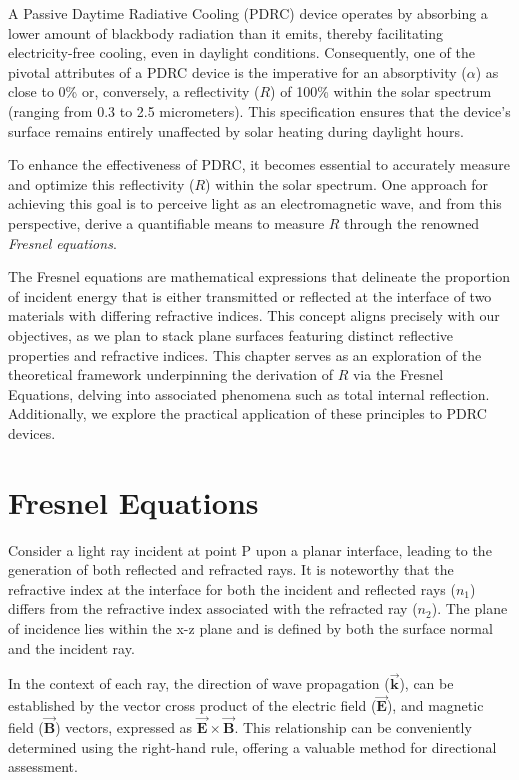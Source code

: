 A Passive Daytime Radiative Cooling (PDRC) device operates by absorbing a lower amount of blackbody radiation than it emits, thereby facilitating electricity-free cooling, even in daylight conditions. Consequently, one of the pivotal attributes of a PDRC device is the imperative for an absorptivity ($\alpha$) as close to 0\% or, conversely, a reflectivity ($R$) of 100\% within the solar spectrum (ranging from 0.3 to 2.5 micrometers). This specification ensures that the device's surface remains entirely unaffected by solar heating during daylight hours.

To enhance the effectiveness of PDRC, it becomes essential to accurately measure and optimize this reflectivity ($R$) within the solar spectrum. One approach for achieving this goal is to perceive light as an electromagnetic wave, and from this perspective, derive a quantifiable means to measure $R$ through the renowned \textit{Fresnel equations}.

The Fresnel equations are mathematical expressions that delineate the proportion of incident energy that is either transmitted or reflected at the interface of two materials with differing refractive indices. This concept aligns precisely with our objectives, as we plan to stack plane surfaces featuring distinct reflective properties and refractive indices. This chapter serves as an exploration of the theoretical framework underpinning the derivation of $R$ via the Fresnel Equations, delving into associated phenomena such as total internal reflection. Additionally, we explore the practical application of these principles to PDRC devices.

\section{Fresnel Equations}
Consider a light ray incident at point P upon a planar interface, leading to the generation of both reflected and refracted rays. It is noteworthy that the refractive index at the interface for both the incident and reflected rays ($n_1$) differs from the refractive index associated with the refracted ray ($n_2$). The plane of incidence lies within the x-z plane and is defined by both the surface normal and the incident ray.

In the context of each ray, the direction of wave propagation ($\vec{\mathbf{k}}$), can be established by the vector cross product of the electric field ($\vec{\mathbf{E}}$), and magnetic field ($\vec{\mathbf{B}}$) vectors, expressed as $\vec{\mathbf{E}} \times \vec{\mathbf{B}}$. This relationship can be conveniently determined using the right-hand rule, offering a valuable method for directional assessment.

